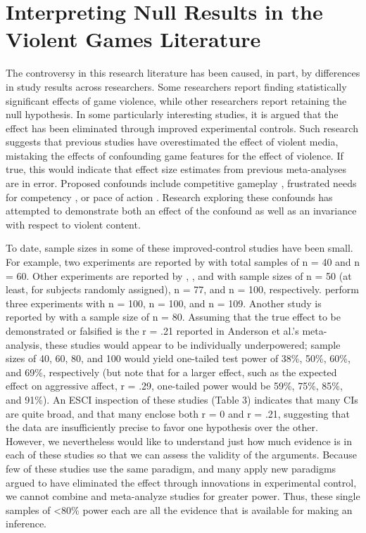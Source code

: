 \documentclass[fignum,nobf,man]{apa}
\begin{document}
\section{Interpreting Null Results in the Violent Games Literature}
The controversy in this research literature has been caused, in part, by differences in study results across researchers. Some researchers report finding statistically significant effects of game violence, while other researchers report retaining the null hypothesis. In some particularly interesting studies, it is argued that the effect has been eliminated through improved experimental controls. Such research suggests that previous studies have overestimated the effect of violent media, mistaking the effects of confounding game features for the effect of violence. If true, this would indicate that effect size estimates from previous meta-analyses \citet[e.g. r = .21,][]{Anderson:etal:2010} are in error. Proposed confounds include competitive gameplay \citep{Adachi:Willoughby:2011}, frustrated needs for competency \citep{Przybylski:etal:2014}, or pace of action \citep{Elson:etal:2014}. Research exploring these confounds has attempted to demonstrate both an effect of the confound as well as an invariance with respect to violent content. 

To date, sample sizes in some of these improved-control studies have been small. For example, two experiments are reported by \citet{Adachi:Willoughby:2011} with total samples of n = 40 and n = 60. Other experiments are reported by \citet{Ferguson:etal:2008}, \citet{Ferguson:Rueda:2010}, and \citet{Valadez:Ferguson:2012} with sample sizes of n = 50 (at least, for subjects randomly assigned), n = 77, and n = 100, respectively. \citet[Studies 1, 2, and 5]{Przybylski:etal:2014} %
perform three experiments with n = 100, n = 100, and n = 109. Another study is reported by \citet{Elson:etal:2014} with a sample size of n = 80. Assuming that the true effect to be demonstrated or falsified is the r = .21 reported in Anderson et al.'s meta-analysis, these studies would appear to be individually underpowered; sample sizes of 40, 60, 80, and 100 would yield one-tailed test power of 38\%, 50\%, 60\%, and 69\%, respectively (but note that for a larger effect, such as the expected effect on aggressive affect, r = .29, one-tailed power would be 59\%, 75\%, 85\%, and 91\%). An ESCI inspection of these studies (Table 3) indicates that many CIs are quite broad, and that many enclose both r = 0 and r = .21, suggesting that the data are insufficiently precise to favor one hypothesis over the other. However, we nevertheless would like to understand just how much evidence is in each of these studies so that we can assess the validity of the arguments. Because few of these studies use the same paradigm, and many apply new paradigms argued to have eliminated the effect through innovations in experimental control, we cannot combine and meta-analyze studies for greater power. Thus, these single samples of <80\% power each are all the evidence that is available for making an inference.
\end{document}

